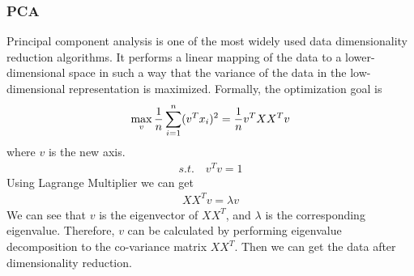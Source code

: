 \documentclass{article}
\begin{document}
\subsubsection{PCA}
\indent Principal component analysis is one of the most widely used data dimensionality reduction algorithms. It performs a linear mapping of the data to a lower-dimensional space in such a way that the variance of the data in the low-dimensional representation is maximized\cite{pearson1901liii}.
Formally, the optimization goal is
\begin{eqnarray}
\centering
\max_v \frac{1}{n}\sum_{i=1}^{n}(v^Tx_i)^2=\frac{1}{n}v^TXX^Tv
\end{eqnarray}
where $v$ is the new axis.
\begin{eqnarray}
s.t.\quad v^Tv=1
\end{eqnarray}
Using Lagrange Multiplier we can get
\begin{eqnarray}
XX^Tv=\lambda v
\end{eqnarray}
We can see that $v$ is the eigenvector of $XX^T$, and $\lambda$ is the corresponding eigenvalue. Therefore, $v$ can be calculated by performing eigenvalue decomposition to the co-variance matrix $XX^T$. Then we can get the data after dimensionality reduction.
\end{document}
